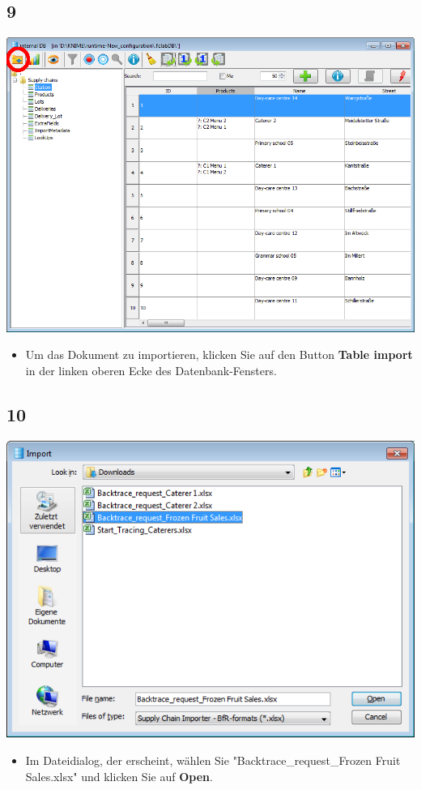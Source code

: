 \documentclass{beamer}
\begin{document}
\subsection{9}
\begin{frame}
	\begin{center}
  		\includegraphics[height=0.6\textheight]{9.png}
	\end{center}
	\begin{itemize}
		\item Um das Dokument zu importieren, klicken Sie auf den Button \textbf{Table import} in der linken oberen Ecke des Datenbank-Fensters.
	\end{itemize}
\end{frame}

\subsection{10}
\begin{frame}
	\begin{center}
  		\includegraphics[height=0.5\textheight]{10.png}
	\end{center}
	\begin{itemize}
		\item Im Dateidialog, der erscheint, wählen Sie "Backtrace\_request\_Frozen Fruit Sales.xlsx" und klicken Sie auf \textbf{Open}.
	\end{itemize}
\end{frame}
\end{document}
